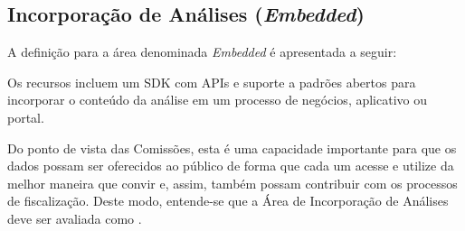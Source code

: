 \subsection{Incorporação de Análises (\emph{Embedded})}
\label{sub-embedded}

A definição para a área denominada \emph{Embedded} é apresentada a seguir:

\begin{definition}
Os recursos incluem um SDK com APIs e suporte a padrões abertos para incorporar o conteúdo da análise em um processo de negócios, aplicativo ou portal.
\end{definition}


Do ponto de vista das Comissões, esta é uma capacidade importante para que os dados possam ser oferecidos ao público de forma que cada um acesse e utilize da melhor maneira que convir e, assim, também possam contribuir com os processos de fiscalização. Deste modo, entende-se que a Área de Incorporação de Análises deve ser avaliada como \SHOULD.
